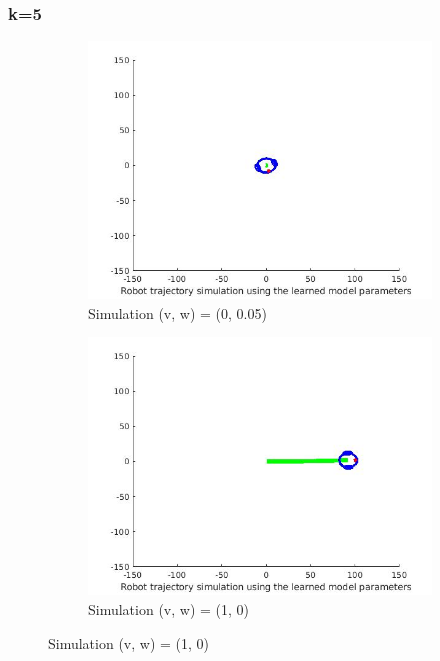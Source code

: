 \documentclass{article}
\begin{document}
\subsubsection*{k=5}
\begin{figure}[ht]
	\begin{subfigure}{.5\textwidth}
		\centering
		\includegraphics[width=1.\linewidth]{1.jpg}  
		\caption{Simulation (v, w) = (0, 0.05)}
	\end{subfigure}
	\begin{subfigure}{.5\textwidth}
		\centering
		\includegraphics[width=1.\linewidth]{2.jpg}  
		\caption{Simulation (v, w) = (1, 0)}
	\end{subfigure}

\end{figure}
\end{document}
